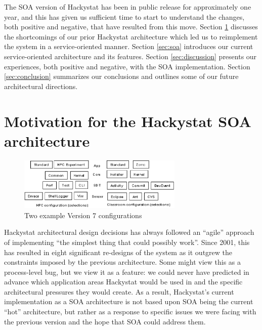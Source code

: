 \documentclass[conference,compsoc,peerreview]{IEEEtran}
\begin{document}
The SOA version of Hackystat has been in public release for approximately
one year, and this has given us sufficient time to start to understand the
changes, both positive and negative, that have resulted from this move.
Section \ref{sec:motivation} discusses the shortcomings of our prior
Hackystat architecture which led us to reimplement the system in a
service-oriented manner.  Section \ref{sec:soa} introduces our current
service-oriented architecture and its features.  Section
\ref{sec:discussion} presents our experiences, both positive and negative,
with the SOA implementation.  Section \ref{sec:conclusion} summarizes our
conclusions and outlines some of our future architectural directions.


\section{Motivation for the Hackystat SOA architecture}
\label{sec:motivation}


\begin{figure}[ht]
  \center
  \includegraphics[width=0.7\textwidth]{configurations5.eps}
  \caption{Two example Version 7 configurations}
  \label{fig:configurations}
\end{figure} 

Hackystat architectural design decisions has always followed an ``agile''
approach of implementing ``the simplest thing that could possibly work''.
Since 2001, this has resulted in eight significant re-designs of the system
as it outgrew the constraints imposed by the previous architecture.  Some
might view this as a process-level bug, but we view it as a feature: we
could never have predicted in advance which application areas Hackystat
would be used in and the specific architectural pressures they would
create.  As a result, Hackystat's current implementation as a SOA
architecture is not based upon SOA being the current ``hot'' architecture,
but rather as a response to specific issues we were facing with the
previous version and the hope that SOA could address them.
\end{document}
